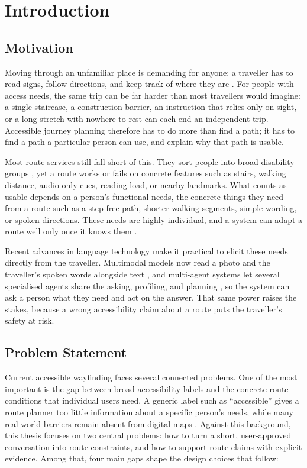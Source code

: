 \documentclass[../CLthesis.tex]{subfiles}
\begin{document}
\chapter{Introduction}%
\label{chap:intro}
\section{Motivation}
Moving through an unfamiliar place is demanding for anyone: a traveller has to read signs, follow directions, and keep track of where they are \citep{armitage2022priority}. For people with access needs, the same trip can be far harder than most travellers would imagine: a single staircase, a construction barrier, an instruction that relies only on sight, or a long stretch with nowhere to rest can each end an independent trip. Accessible journey planning therefore has to do more than find a path; it has to find a path a particular person can use, and explain why that path is usable.

Most route services still fall short of this. They sort people into broad disability groups \citep{crudele2023accessible, ruginski2022designing}, yet a route works or fails on concrete features such as stairs, walking distance, audio-only cues, reading load, or nearby landmarks. What counts as usable depends on a person's functional needs, the concrete things they need from a route such as a step-free path, shorter walking segments, simple wording, or spoken directions. These needs are highly individual, and a system can adapt a route well only once it knows them \citep{wobbrock2011ability}.

Recent advances in language technology make it practical to elicit these needs directly from the traveller. Multimodal models now read a photo and the traveller's spoken words alongside text \citep{radford2023whisper, yin2024survey}, and multi-agent systems let several specialised agents share the asking, profiling, and planning \citep{wu2023autogen, li2023camel}, so the system can ask a person what they need and act on the answer. That same power raises the stakes, because a wrong accessibility claim about a route puts the traveller's safety at risk.


\section{Problem Statement}
\label{sec:problem}
Current accessible wayfinding faces several connected problems. One of the most important is the gap between broad accessibility labels and the concrete route conditions that individual users need. A generic label such as ``accessible'' gives a route planner too little information about a specific person’s needs, while many real-world barriers remain absent from digital maps \citep{crudele2023accessible, allahbakhshi2024navigationchallenges}. Against this background, this thesis focuses on two central problems: how to turn a short, user-approved conversation into route constraints, and how to support route claims with explicit evidence. Among that, four main gaps shape the design choices that follow:
\end{document}
